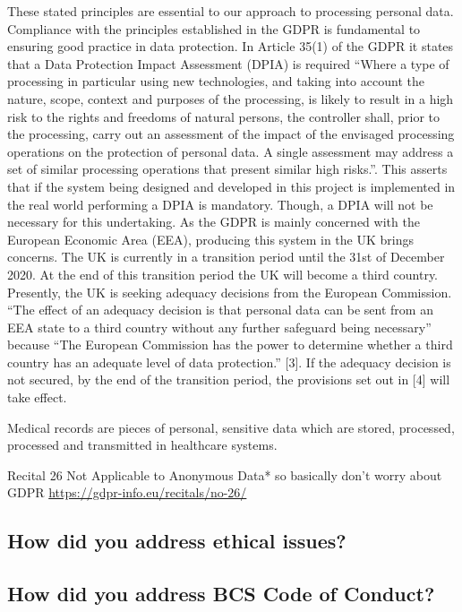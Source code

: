 \documentclass{report}
\begin{document}
\begin{flushleft}
These stated principles are essential to our approach to
processing personal data. Compliance with the principles
established in the GDPR is fundamental to ensuring good
practice in data protection.
In Article 35(1) of the GDPR it states that a Data Protection
Impact Assessment (DPIA) is required “Where a type of
processing in particular using new technologies, and taking
into account the nature, scope, context and purposes of the
processing, is likely to result in a high risk to the rights and
freedoms of natural persons, the controller shall, prior to the
processing, carry out an assessment of the impact of the
envisaged processing operations on the protection of personal
data. A single assessment may address a set of similar
processing operations that present similar high risks.”. This
asserts that if the system being designed and developed in this
project is implemented in the real world performing a DPIA is
mandatory. Though, a DPIA will not be necessary for this
undertaking.
As the GDPR is mainly concerned with the European
Economic Area (EEA), producing this system in the UK
brings concerns. The UK is currently in a transition period
until the 31st of December 2020. At the end of this transition
period the UK will become a third country. Presently, the UK
is seeking adequacy decisions from the European
Commission. “The effect of an adequacy decision is that
personal data can be sent from an EEA state to a third country
without any further safeguard being necessary” because “The
European Commission has the power to determine whether a
third country has an adequate level of data protection.” [3]. If
the adequacy decision is not secured, by the end of the
transition period, the provisions set out in [4] will take effect.

Medical records are pieces of personal, sensitive data which are stored, processed, processed and transmitted in healthcare systems. %

Recital 26 Not Applicable to Anonymous Data* so basically don't worry about GDPR  \url{https://gdpr-info.eu/recitals/no-26/}

\subsection{How did you address ethical issues?}

\subsection{How did you address BCS Code of Conduct?} 


\end{flushleft}
\end{document}
